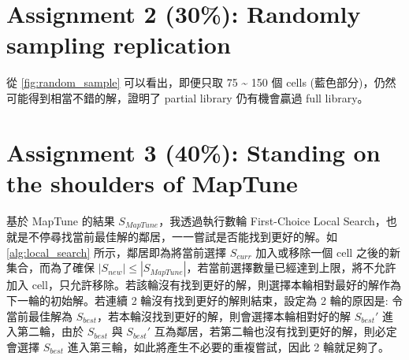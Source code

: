 \documentclass[12pt]{article}
\begin{document}
\section*{Assignment 2 (30\%): Randomly sampling replication}

從 \autoref{fig:random_sample} 可以看出，即便只取 75 \~{} 150 個 cells (藍色部分)，仍然可能得到相當不錯的解，證明了 partial library 仍有機會贏過 full library。



\section*{Assignment 3 (40\%): Standing on the shoulders of MapTune}

基於 MapTune 的結果 $S_{MapTune}$，我透過執行數輪 First-Choice Local Search，也就是不停尋找當前最佳解的鄰居，一一嘗試是否能找到更好的解。如 \autoref{alg:local_search} 所示，鄰居即為將當前選擇 $S_{curr}$ 加入或移除一個 cell 之後的新集合，而為了確保 $|S_{new}| \leq |S_{MapTune}|$，若當前選擇數量已經達到上限，將不允許加入 cell，只允許移除。若該輪沒有找到更好的解，則選擇本輪相對最好的解作為下一輪的初始解。若連續 2 輪沒有找到更好的解則結束，設定為 2 輪的原因是: 令當前最佳解為 $S_{best}$，若本輪沒找到更好的解，則會選擇本輪相對好的解 $S_{best}'$ 進入第二輪，由於 $S_{best}$ 與 $S_{best}'$ 互為鄰居，若第二輪也沒有找到更好的解，則必定會選擇 $S_{best}$ 進入第三輪，如此將產生不必要的重複嘗試，因此 2 輪就足夠了。
\end{document}
